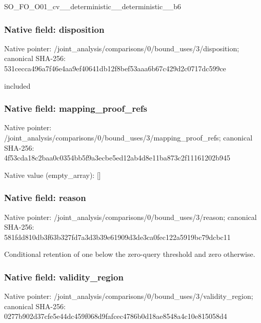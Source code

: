 \documentclass[10pt,a4paper]{article}
\begin{document}
\begingroup\raggedright\sloppy SO\_\allowbreak{}FO\_\allowbreak{}O01\_\allowbreak{}cv\_\allowbreak{}\_\allowbreak{}deterministic\_\allowbreak{}\_\allowbreak{}deterministic\_\allowbreak{}\_\allowbreak{}b6\par\endgroup

\subsubsection{Native field: disposition}
Native pointer: /joint\_\allowbreak{}analysis/comparisons/0/bound\_\allowbreak{}uses/3/disposition; canonical SHA-256: 531cecca496a7f46e4aa9ef40641db12f8bef53aaa6b67c429d2c0717dc599ce

\begingroup\raggedright\sloppy included\par\endgroup

\subsubsection{Native field: mapping\_\allowbreak{}proof\_\allowbreak{}refs}
Native pointer: /joint\_\allowbreak{}analysis/comparisons/0/bound\_\allowbreak{}uses/3/mapping\_\allowbreak{}proof\_\allowbreak{}refs; canonical SHA-256: 4f53cda18c2baa0c0354bb5f9a3ecbe5ed12ab4d8e11ba873c2f11161202b945

Native value (empty\_\allowbreak{}array): []

\subsubsection{Native field: reason}
Native pointer: /joint\_\allowbreak{}analysis/comparisons/0/bound\_\allowbreak{}uses/3/reason; canonical SHA-256: 581fdd810db3f63b327fd7a3d3b39e61909d3de3ca0fec122a5919bc79dcbc11

\begingroup\raggedright\sloppy Conditional retention of one below the zero-query threshold and zero otherwise.\par\endgroup

\subsubsection{Native field: validity\_\allowbreak{}region}
Native pointer: /joint\_\allowbreak{}analysis/comparisons/0/bound\_\allowbreak{}uses/3/validity\_\allowbreak{}region; canonical SHA-256: 0277b902d37cfe5e44dc459f068d9fafcec4786b0d18ae8548a4c10e815058d4
\end{document}
